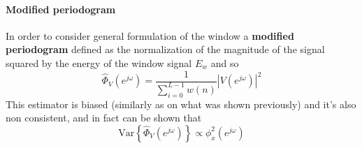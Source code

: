 	\paragraph{Modified periodogram} In order to consider general formulation of the window a \textbf{modified periodogram} defined as the normalization of the magnitude of the signal squared by the energy of the window signal $E_w$ and so	
	\begin{equation}
		\hat \Phi_V(e^{j\omega}) = \frac{1}{\sum_{i=0}^{L-1} w(n) } |V(e^{j\omega})|^2
	\end{equation}
	This estimator is biased (similarly as on what was shown previously) and it's also non consistent, and in fact can be shown that
	\[ \textrm{Var}\left\{\hat \Phi_V(e^{j\omega})\right\} \propto \phi_x^2(e^{j\omega}) \]
	
	
	
	
	
	
	
	
	
	
	
	
	
	
	
	
	
	
	
	